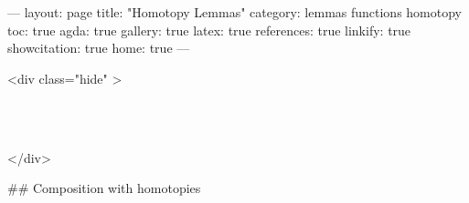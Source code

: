 ---
layout: page
title: "Homotopy Lemmas"
category: lemmas functions homotopy
toc: true
agda: true
gallery: true
latex: true
references: true
linkify: true
showcitation: true
home: true
---

<div class="hide" >
\begin{code}%
\>[0]\AgdaSymbol{\{-\#}\AgdaSpace{}%
\AgdaSpace{}%
\AgdaSpace{}%
\AgdaSymbol{\#-\}}\<%
\\
\>[0]\AgdaSpace{}%
\AgdaSpace{}%
\<%
\\
\>[0]\AgdaSpace{}%
\AgdaSpace{}%
\<%
\end{code}
</div>

## Composition with homotopies

